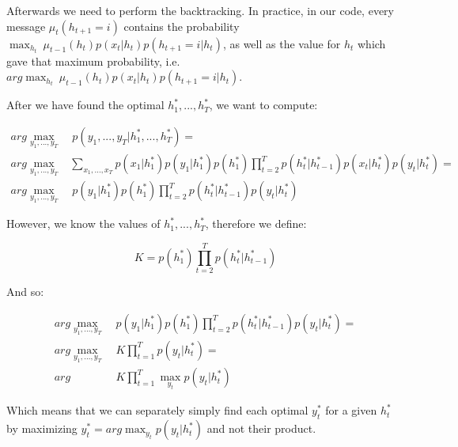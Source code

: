 \documentclass[11pt,a4paper,oneside]{report}
\begin{document}
Afterwards we need to perform the backtracking. In practice, in our code, every message $\mu_t(h_{t+1} = i)$ contains the probability $\max_{h_t}\ \mu_{t-1}(h_t)p(x_t|h_t)p(h_{t+1}=i|h_t)$, as well as the value for $h_t$ which gave that maximum probability, i.e. $arg\max_{h_t}\ \mu_{t-1}(h_t)p(x_t|h_t)p(h_{t+1}=i|h_t)$.

After we have found the optimal $h_1^\ast,...,h_T^\ast$, we want to compute:

\begin{align*}
arg\max_{y_1,...,y_T}&\ p(y_1,...,y_T|h_1^\ast,...,h_T^\ast)=\\
arg\max_{y_1,...,y_T}&\sum_{x_1,...,x_T}p(x_1|h_1^\ast)p(y_1|h_1^\ast)p(h_1^\ast)\prod_{t=2}^Tp(h_t^\ast|h_{t-1}^\ast)p(x_t|h_t^\ast)p(y_t|h_t^\ast)=\\
arg\max_{y_1,...,y_T}&\ p(y_1|h_1^\ast)p(h_1^\ast)\prod_{t=2}^Tp(h_t^\ast|h_{t-1}^\ast)p(y_t|h_t^\ast)
\end{align*}

However, we know the values of $h_1^\ast,...,h_T^\ast$, therefore we define:

$$K = p(h_1^\ast)\prod_{t=2}^Tp(h_t^\ast|h_{t-1}^\ast)$$

And so:

\begin{align*}
arg\max_{y_1,...,y_T}&\ p(y_1|h_1^\ast)p(h_1^\ast)\prod_{t=2}^Tp(h_t^\ast|h_{t-1}^\ast)p(y_t|h_t^\ast)=\\
arg\max_{y_1,...,y_T}&\ K\prod_{t=1}^Tp(y_t|h_t^\ast)=\\
arg&\ K\prod_{t=1}^T\max_{y_t}p(y_t|h_t^\ast)
\end{align*}

Which means that we can separately simply find each optimal $y_t^\ast$ for a given $h_t^\ast$ by maximizing $y_t^\ast=arg\max_{y_t}p(y_t|h_t^\ast)$ and not their product.\\
\end{document}
